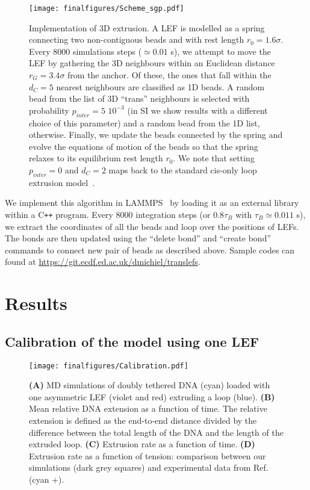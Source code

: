 \documentclass[aps,prl,twocolumn,a4paper,10pt,notitlepage,footinbib,nobalancelastpage,superscriptaddress,showpacs,floatfix]{revtex4-1}%
\begin{document}
\begin{figure}[t!]
	\begin{center}
	\texttt{[image: finalfigures/Scheme\_sgp.pdf]}
	\end{center}
	\vspace{-0.5 cm}
	\caption{Implementation of 3D extrusion. A LEF is modelled as a spring connecting two non-contiguous beads and with rest length $r_0 = 1.6\sigma$. Every 8000 simulations steps ($\simeq 0.01$ s), we attempt to move the LEF by gathering the 3D neighbours within an Euclidean distance $r_G=3.4 \sigma$ from the anchor. Of these, the ones that fall within the $d_C=5$ nearest neighbours are classified as 1D beads. A random bead from the list of 3D ``trans'' neighbours is selected with probability $p_{inter}= 5$ $10^{-3}$ (in SI we show results with a different choice of this parameter) and a random bead from the 1D list, otherwise. Finally, we update the beads connected by the spring and evolve the equations of motion of the beads so that the spring relaxes to its equilibrium rest length $r_0$. We note that setting $p_{inter}=0$ and $d_C=2$ maps back to the standard cis-only loop extrusion model~\cite{Fudenberg2016,Sanborn2015a}.}
	\label{fig_sgp}
\end{figure}

We implement this algorithm in LAMMPS~\cite{Plimpton1995a} by loading it as an external library within a C\texttt{++} program. Every 8000 integration steps (or $0.8 \tau_B$ with $\tau_B \simeq 0.011$ s), we extract the coordinates of all the beads and loop over the positions of LEFs. The bonds are then updated using the ``delete bond'' and ``create bond'' commands to connect new pair of beads as described above. Sample codes can found at \url{https://git.ecdf.ed.ac.uk/dmichiel/translefs}.


\section{Results}

\subsection{Calibration of the model using one LEF}

\begin{figure}[t]
	\begin{center}
	\texttt{[image: finalfigures/Calibration.pdf]}
	\end{center}
	\caption{\textbf{(A)} MD simulations of doubly tethered DNA (cyan) loaded with one asymmetric LEF (violet and red) extruding a loop (blue). \textbf{(B)} Mean relative DNA extension as a function of time. The relative extension is defined as the end-to-end distance divided by the difference between the total length of the DNA and the length of the extruded loop. \textbf{(C)} Extrusion rate as a function of time. \textbf{(D)} Extrusion rate as a function of tension: comparison between our simulations (dark grey squares) and experimental data from Ref.~\cite{Ganji2018} (cyan +).}
	\label{fig_Calibration}
\end{figure}
\end{document}
